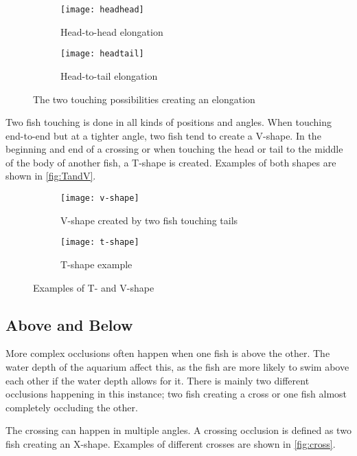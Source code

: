 \begin{figure}[H]
	\centering
	\begin{subfigure}[b]{0.47\textwidth}
		\texttt{[image: headhead]}
		\caption{Head-to-head elongation}
		\label{fig:headhead}
	\end{subfigure}
	\begin{subfigure}[b]{0.47\textwidth}
		\texttt{[image: headtail]}
		\caption{Head-to-tail elongation}
		\label{fig:headtail}
	\end{subfigure}
\caption{The two touching possibilities creating an elongation}
\label{fig:elongation}
\end{figure}

Two fish touching is done in all kinds of positions and angles. When touching end-to-end but at a tighter angle, two fish tend to create a V-shape. In the beginning and end of a crossing or when touching the head or tail to the middle of the body of another fish, a T-shape is created. Examples of both shapes are shown in \autoref{fig:TandV}.

\begin{figure}[H]
	\centering
	\begin{subfigure}[b]{0.47\textwidth}
		\texttt{[image: v-shape]}
		\caption{V-shape created by two fish touching tails}
		\label{fig:v-shape}
	\end{subfigure}
	\begin{subfigure}[b]{0.47\textwidth}
		\texttt{[image: t-shape]}
		\caption{T-shape example}
		\label{fig:t-shape}
	\end{subfigure}
\caption{Examples of T- and V-shape}
\label{fig:TandV}
\end{figure}

\subsection{Above and Below}
More complex occlusions often happen when one fish is above the other. The water depth of the aquarium affect this, as the fish are more likely to swim above each other if the water depth allows for it. There is mainly two different occlusions happening in this instance; two fish creating a cross or one fish almost completely occluding the other.

The crossing can happen in multiple angles. A crossing occlusion is defined as two fish creating an X-shape. Examples of different crosses are shown in \autoref{fig:cross}. 

